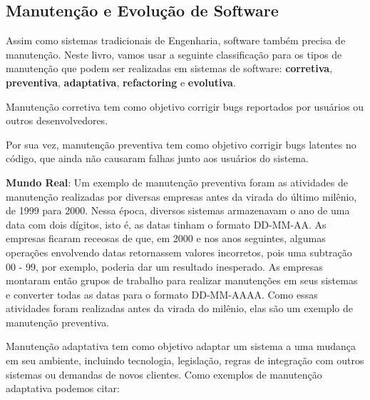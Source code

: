 \documentclass[
  11pt,
  twoside]{book}
\newenvironment{esmbox}{\centering \vspace{1.5ex} \begin{tcolorbox}[breakable, colback=backcolor, width=4.9in]}{\end{tcolorbox} \vspace{1.5ex}}
\begin{document}
\hypertarget{manutenuxe7uxe3o-e-evoluuxe7uxe3o-de-software}{%
\subsection{Manutenção e Evolução de
Software}\label{manutenuxe7uxe3o-e-evoluuxe7uxe3o-de-software}}


Assim como sistemas tradicionais de Engenharia, software também precisa
de manutenção. Neste livro, vamos usar a seguinte classificação para os
tipos de manutenção que podem ser realizadas em sistemas de software:
\textbf{corretiva}, \textbf{preventiva}, \textbf{adaptativa},
\textbf{refactoring} e \textbf{evolutiva}.

 Manutenção corretiva tem como
objetivo corrigir bugs reportados por usuários ou outros
desenvolvedores.

 Por sua vez, manutenção
preventiva tem como objetivo corrigir bugs latentes no código, que ainda
não causaram falhas junto aos usuários do sistema.


\begin{esmbox}

\textbf{Mundo Real}: Um exemplo de manutenção preventiva foram as
atividades de manutenção realizadas por diversas empresas antes da
virada do último milênio, de 1999 para 2000. Nessa época, diversos
sistemas armazenavam o ano de uma data com dois dígitos, isto é, as
datas tinham o formato DD-MM-AA. As empresas ficaram receosas de que, em
2000 e nos anos seguintes, algumas operações envolvendo datas
retornassem valores incorretos, pois uma subtração 00 - 99, por exemplo,
poderia dar um resultado inesperado. As empresas montaram então grupos
de trabalho para realizar manutenções em seus sistemas e converter todas
as datas para o formato DD-MM-AAAA. Como essas atividades foram
realizadas antes da virada do milênio, elas são um exemplo de manutenção
preventiva.

\end{esmbox}

 Manutenção adaptativa tem como
objetivo adaptar um sistema a uma mudança em seu ambiente, incluindo
tecnologia, legislação, regras de integração com outros sistemas ou
demandas de novos clientes. Como exemplos de manutenção adaptativa
podemos citar:
\end{document}
